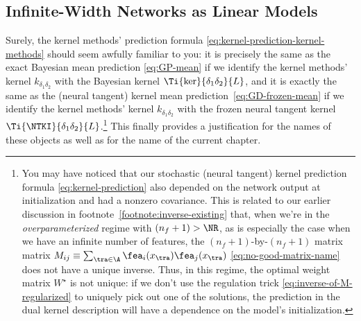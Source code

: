 \subsection{Infinite-Width Networks as Linear Models}\label{subsec:linear-at-infinity}

Surely, the kernel methods' prediction formula \eqref{eq:kernel-prediction-kernel-methods}  should seem awfully familiar to you:  it is precisely the same as the exact Bayesian mean prediction \eqref{eq:GP-mean} if we identify the kernel methods' kernel $k_{\delta_1\delta_2}$ with the Bayesian kernel $\Ti{\ker}{\delta_1\delta_2}{L}$, and it is exactly the same as the (neural tangent) kernel mean prediction~\eqref{eq:GD-frozen-mean} if we identify the kernel methods' kernel $k_{\delta_1\delta_2}$ with the frozen neural tangent kernel $\Ti{\NTKI}{\delta_1\delta_2}{L}$.\footnote{You may have noticed that our stochastic (neural tangent) kernel prediction formula \eqref{eq:kernel-prediction} also depended on the network output at initialization and had a nonzero covariance. This is related to our earlier discussion in footnote~\ref{footnote:inverse-existing} that, when we're in the \emph{overparameterized} regime with $(n_f+1)>\NR$, as is especially the case when we have an infinite number of features, the $(n_f+1)$-by-$(n_f+1)$ matrix matrix $M_{ij} \equiv\sum_{\tra\in\A}\fea_i(x_{\tra})\fea_j(x_{\tra})$  \eqref{eq:no-good-matrix-name} does not have a unique inverse. Thus, in this regime, the optimal weight matrix $W^{\star}$ is not unique: if we don't use the regulation trick \eqref{eq:inverse-of-M-regularized} to uniquely pick out one of the solutions, 
the prediction in the dual kernel description 
will have a dependence on the model's initialization.
} 
This finally provides a justification for the names of these objects as well as for the name of the current chapter.



